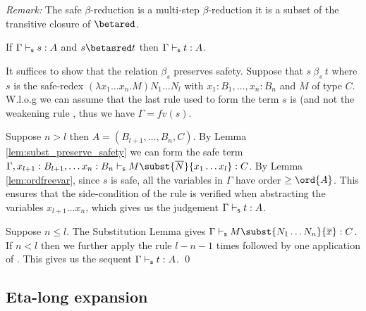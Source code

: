 \noindent \emph{Remark:} The safe $\beta$-reduction is a multi-step
$\beta$-reduction \ie it is a subset of the transitive closure of
$\betared$.


\begin{lemma}
\label{lem:safered_preserve_safety}
If $\Gamma \vdash_{\sf s} s :A$ and $s \betasred t$ then $\Gamma \vdash_{\sf s} t :A$.
\end{lemma}

\proof
  It suffices to show that the relation $\beta_s$ preserves safety.
Suppose that $s\ \beta_s\ t$ where $s$ is the
safe-redex $(\lambda x_1 \ldots x_n . M) N_1
  \ldots N_l $ with $x_1 : B_1, \ldots, x_n: B_n$
and $M$ of type $C$.  W.l.o.g we can assume that the last rule used
to form the term $s$ is  (and not the weakening rule
, thus  we have $\Gamma = fv(s)$.

Suppose $n>l$ then $A = (B_{l+1}, \ldots, B_n, C)$. By Lemma \ref{lem:subst_preserve_safety} we can form the safe term
$\Gamma, x_{l+1}:B_{l+1}, \ldots x_n :B_{n}\sentail M\subst{\overline{N}}{x_1 \ldots x_l} : C$.
By Lemma \ref{lem:ordfreevar}, since $s$ is safe, all the variables
in $\Gamma$ have order $\geq \ord{A}$. This ensures that the
side-condition of the  rule is verified when
abstracting the variables $x_{l+1} \ldots x_n$, which gives us the
judgement $\Gamma \vdash_{\sf s} t :A$.

Suppose $n \leq l$. The Substitution Lemma gives $\Gamma \sentail
M\subst{N_1 \ldots N_n}{\overline{x}} : C$. If $n<l$ then we further apply the rule  $l-n-1$ times followed by one application of
. This gives us the sequent $\Gamma \vdash_{\sf s} t :A$.
  \qed

\subsection*{Eta-long expansion}

